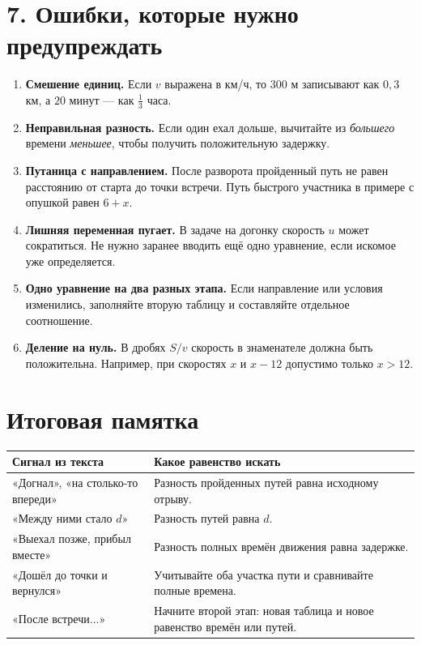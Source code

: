 \documentclass[a4paper,12pt]{article}
\begin{document}
\section*{7. Ошибки, которые нужно предупреждать}
\begin{enumerate}
\item \textbf{Смешение единиц.} Если $v$ выражена в км/ч, то $300$ м записывают как $0{,}3$ км, а $20$ минут --- как $\frac13$ часа.
\item \textbf{Неправильная разность.} Если один ехал дольше, вычитайте из \emph{большего} времени \emph{меньшее}, чтобы получить положительную задержку.
\item \textbf{Путаница с направлением.} После разворота пройденный путь не равен расстоянию от старта до точки встречи. Путь быстрого участника в примере с опушкой равен $6+x$.
\item \textbf{Лишняя переменная пугает.} В задаче на догонку скорость $u$ может сократиться. Не нужно заранее вводить ещё одно уравнение, если искомое уже определяется.
\item \textbf{Одно уравнение на два разных этапа.} Если направление или условия изменились, заполняйте вторую таблицу и составляйте отдельное соотношение.
\item \textbf{Деление на нуль.} В дробях $S/v$ скорость в знаменателе должна быть положительна. Например, при скоростях $x$ и $x-12$ допустимо только $x>12$.
\end{enumerate}

\section*{Итоговая памятка}
\begin{center}
\renewcommand{\arraystretch}{1.34}
\begin{tabularx}{\linewidth}{@{}p{.40\linewidth}X@{}}
\toprule
Сигнал из текста & Какое равенство искать\\
\midrule
«Догнал», «на столько-то впереди» & Разность пройденных путей равна исходному отрыву.\\
«Между ними стало $d$» & Разность путей равна $d$.\\
«Выехал позже, прибыл вместе» & Разность полных времён движения равна задержке.\\
«Дошёл до точки и вернулся» & Учитывайте оба участка пути и сравнивайте полные времена.\\
«После встречи...» & Начните второй этап: новая таблица и новое равенство времён или путей.\\
\bottomrule
\end{tabularx}
\end{center}
\end{document}
